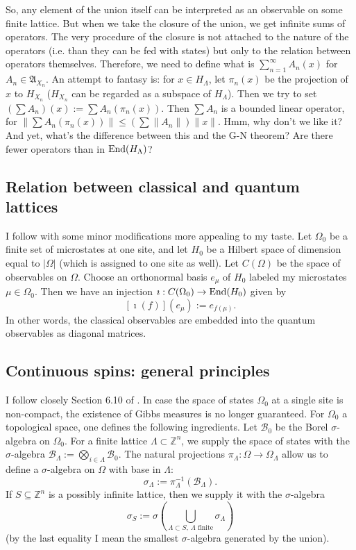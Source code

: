 \begin{ths}
So, any element of the union itself can be interpreted as an observable on some finite lattice. But when we take the closure of the union, we get infinite sums of operators. The very procedure of the closure is not attached to the nature of the operators (i.e. than they can be fed with states) but only to the relation between operators themselves. Therefore, we need to define what is $\sum_{n=1}^\infty A_n (x)$ for $A_n \in \mathfrak A_{X_n}$. An attempt to fantasy is: for $x \in H_{\Lambda}$, let $\pi_n(x)$ be the projection of $x$ to $H_{X_n}$ ($H_{X_n}$ can be regarded as a subspace of $H_{\Lambda}$). Then we try to set $(\sum A_{n})(x):= \sum A_n(\pi_n(x))$. Then $\sum A_{n}$ is a bounded linear operator, for $\|\sum A_n(\pi_n(x))\| \leq (\sum \|A_n\|)\|x\|$. Hmm, why don't we like it? And yet, what's the difference between this and the G-N theorem? Are there fewer operators than in $\operatorname{End}(H_{\Lambda})$?
\end{ths}

\subsection{Relation between classical and quantum lattices}
I follow \cite{israel} with some minor modifications more appealing to my taste. Let $\Omega_0$ be a finite set of microstates at one site, and let $H_0$ be a Hilbert space of dimension equal to $|\Omega|$ (which is assigned to one site as well). Let $C(\Omega)$ be the space of observables on $\Omega$. Choose an orthonormal basis $e_{\mu}$ of $H_0$ labeled my microstates $\mu \in \Omega_0$. Then we have an injection $\imath : C(\Omega_0) \rightarrow \operatorname{End}(H_0)$ given by
\[
[\imath(f)](e_{\mu}) := e_{f(\mu)}.
\]
In other words, the classical observables are embedded into the quantum observables as diagonal matrices.

\subsection{Continuous spins: general principles}\label{ss:gen_princ}
I follow closely Section 6.10 of \cite{friedli}. In case the space of states $\Omega_0$ at a single site is non-compact, the existence of Gibbs measures is no longer guaranteed. For $\Omega_0$ a topological space, one defines the following ingredients. Let $\mathcal B_0$ be the Borel $\sigma$-algebra on $\Omega_0$. For a finite lattice $\Lambda \subset \mathbb Z^n$, we supply the space of states with the $\sigma$-algebra $\mathcal B_{\Lambda} := \bigotimes_{i \in \Lambda} \mathcal B_0$. The natural projections $\pi_{\Lambda} : \Omega \rightarrow \Omega_{\Lambda}$ allow us to define a $\sigma$-algebra on $\Omega$ with base in $\Lambda$:
\[
\sigma_{\Lambda} := \pi^{-1}_{\Lambda}(\mathcal B_{\Lambda}).
\]
If $S \subseteq \mathbb Z^n$ is a possibly infinite lattice, then we supply it with the $\sigma$-algebra
\[
\sigma_{S} := \sigma(\bigcup_{\Lambda \subset S, \ \Lambda \text{ finite}} \sigma_{\Lambda})
\]
(by the last equality I mean the smallest $\sigma$-algebra generated by the union).

